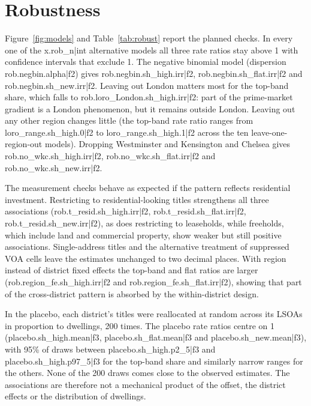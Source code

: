 \documentclass[11pt,a4paper]{article}
\begin{document}
\section{Robustness}\label{sec:robust}
Figure~\ref{fig:models} and Table~\ref{tab:robust} report the planned checks. In every one of the {{x.rob_n|int}} alternative models all three rate ratios stay above 1 with confidence intervals that exclude 1. The negative binomial model (dispersion {{rob.negbin.alpha|f2}}) gives {{rob.negbin.sh_high.irr|f2}}, {{rob.negbin.sh_flat.irr|f2}} and {{rob.negbin.sh_new.irr|f2}}. Leaving out London matters most for the top-band share, which falls to {{rob.loro_London.sh_high.irr|f2}}: part of the prime-market gradient is a London phenomenon, but it remains outside London. Leaving out any other region changes little (the top-band rate ratio ranges from {{loro_range.sh_high.0|f2}} to {{loro_range.sh_high.1|f2}} across the ten leave-one-region-out models). Dropping Westminster and Kensington and Chelsea gives {{rob.no_wkc.sh_high.irr|f2}}, {{rob.no_wkc.sh_flat.irr|f2}} and {{rob.no_wkc.sh_new.irr|f2}}.

The measurement checks behave as expected if the pattern reflects residential investment. Restricting to residential-looking titles strengthens all three associations ({{rob.t_resid.sh_high.irr|f2}}, {{rob.t_resid.sh_flat.irr|f2}}, {{rob.t_resid.sh_new.irr|f2}}), as does restricting to leaseholds, while freeholds, which include land and commercial property, show weaker but still positive associations. Single-address titles and the alternative treatment of suppressed VOA cells leave the estimates unchanged to two decimal places. With region instead of district fixed effects the top-band and flat ratios are larger ({{rob.region_fe.sh_high.irr|f2}} and {{rob.region_fe.sh_flat.irr|f2}}), showing that part of the cross-district pattern is absorbed by the within-district design.

In the placebo, each district's titles were reallocated at random across its LSOAs in proportion to dwellings, 200 times. The placebo rate ratios centre on 1 ({{placebo.sh_high.mean|f3}}, {{placebo.sh_flat.mean|f3}} and {{placebo.sh_new.mean|f3}}), with 95\% of draws between {{placebo.sh_high.p2_5|f3}} and {{placebo.sh_high.p97_5|f3}} for the top-band share and similarly narrow ranges for the others. None of the 200 draws comes close to the observed estimates. The associations are therefore not a mechanical product of the offset, the district effects or the distribution of dwellings.
\end{document}
